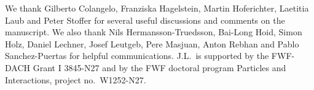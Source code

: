 \vspace{0.2cm}

\noindent
We thank Gilberto Colangelo, Franziska Hagelstein, Martin Hoferichter, Laetitia Laub and Peter Stoffer for several useful discussions and comments on the manuscript. We also thank Nils Hermansson-Truedsson, Bai-Long Hoid, Simon Holz, Daniel Lechner, Josef Leutgeb, Pere Masjuan, Anton Rebhan and Pablo Sanchez-Puertas for helpful communications. J.L.\ is supported by the FWF-DACH Grant I 3845-N27 and by the FWF doctoral program Particles and Interactions, project no.\ W1252-N27.

